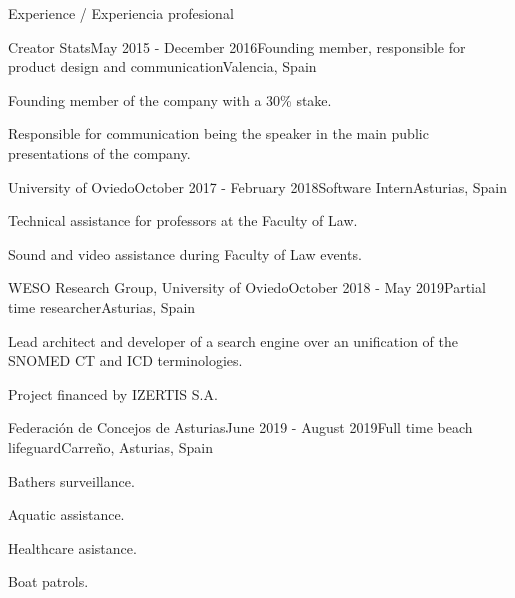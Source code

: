 \documentclass{resume} %
\begin{document}
\begin{rSection}{Experience / Experiencia profesional}

\begin{rSubsection}{Creator Stats}{May 2015 - December 2016}{Founding member, responsible for product design and communication}{Valencia, Spain}
\item Founding member of the company with a 30\% stake.
\item Responsible for communication being the speaker in the main public presentations of the company.
\end{rSubsection}


\begin{rSubsection}{University of Oviedo}{October 2017 - February 2018}{Software Intern}{Asturias, Spain}
    \item Technical assistance for professors at the Faculty of Law.
    \item Sound and video assistance during Faculty of Law events.
    \end{rSubsection}


\begin{rSubsection}{WESO Research Group, University of Oviedo}{October 2018 - May 2019}{Partial time researcher}{Asturias, Spain}
    \item Lead architect and developer of a search engine over an unification of the SNOMED CT and ICD terminologies.
    \item Project financed by IZERTIS S.A.
    \end{rSubsection}


\begin{rSubsection}{Federación de Concejos de Asturias}{June 2019 - August 2019}{Full time beach lifeguard}{Carreño, Asturias, Spain}
    \item Bathers surveillance.
    \item Aquatic assistance.
    \item Healthcare asistance. 
    \item Boat patrols.
    \end{rSubsection}



\end{rSection}
\end{document}
